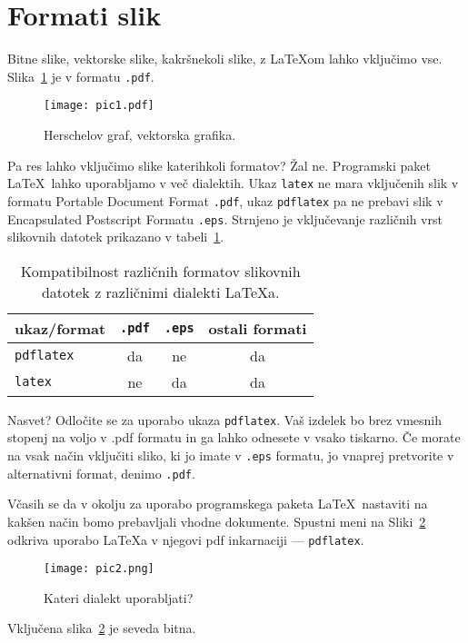 \documentclass[a4paper, 12pt]{book}
\begin{document}
\section{Formati slik}

Bitne slike, vektorske slike, kakršnekoli slike, z \LaTeX{}om lahko vključimo vse.
Slika~\ref{pic1} je v formatu {\tt .pdf}.
\begin{figure}[h]
\begin{center}
\texttt{[image: pic1.pdf]}
\end{center}
\caption{Herschelov graf, vektorska grafika.}
\label{pic1}
\end{figure}
Pa res lahko vključimo slike katerihkoli formatov? 
Žal ne. 
Programski paket \LaTeX\ lahko uporabljamo v več dialektih. 
Ukaz {\tt latex} ne mara vključenih slik v formatu Portable Document Format {\tt .pdf}, ukaz {\tt pdflatex} pa ne prebavi slik v Encapsulated Postscript Formatu {\tt .eps}.
Strnjeno je vključevanje različnih vrst slikovnih datotek prikazano v tabeli~\ref{tbl:1}.

\begin{table}
\begin{center}
\begin{tabular}{l|ccc}
ukaz/format & {\tt .pdf} & {\tt .eps} & ostali formati \\ \hline
{\tt pdflatex} & da & ne & da \\
{\tt latex}   & ne & da  & da
\end{tabular}
\end{center}
\caption{Kompatibilnost različnih formatov slikovnih datotek z različnimi dialekti  \LaTeX a.}
\label{tbl:1}
\end{table}

Nasvet? 
Odločite se za uporabo ukaza {\tt pdflatex}. Vaš izdelek bo brez vmesnih stopenj na voljo v {.pdf} formatu in ga lahko odnesete v vsako tiskarno. 
Če morate na vsak način vključiti sliko, ki jo imate v {\tt .eps} formatu, jo vnaprej pretvorite v alternativni format, denimo {\tt .pdf}.

Včasih se da v okolju za uporabo programskega paketa \LaTeX\ nastaviti na kakšen način bomo prebavljali vhodne dokumente. 
Spustni meni na Sliki~\ref{pic2} odkriva uporabo \LaTeX{}a v njegovi pdf inkarnaciji --- {\tt pdflatex}.
\begin{figure}[t]
\begin{center}
\texttt{[image: pic2.png]}
\end{center}
\caption{Kateri dialekt uporabljati?}
\label{pic2}
\end{figure}
Vključena slika~\ref{pic2} je seveda bitna.
\end{document}
